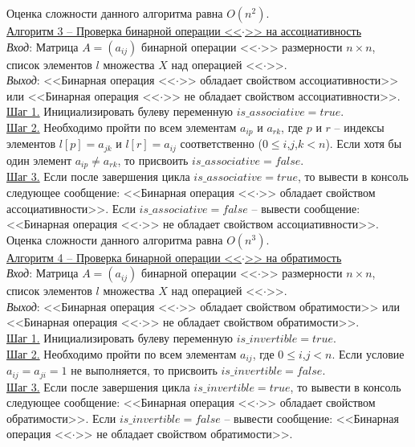 \documentclass[bachelor, och, labwork]{shiza}
\begin{document}
            Оценка сложности данного алгоритма равна $O(n^2)$.\\

        \underline{Алгоритм 3 -- Проверка бинарной операции <<$\cdot$>> на ассоциативность}\\
            \textit{Вход}: Матрица $A = (a_{ij})$ бинарной операции <<$\cdot$>> размерности $n \times n$, список элементов $l$ множества $X$ над
            операцией <<$\cdot$>>.\\
            \textit{Выход}: <<Бинарная операция <<$\cdot$>> обладает свойством ассоциативности>> или 
            <<Бинарная операция <<$\cdot$>> не обладает свойством ассоциативности>>.\\
            \underline{Шаг 1.} Инициализировать булеву переменную $is\_associative = true$.\\
            \underline{Шаг 2.} Необходимо пройти по всем элементам $a_{ip}$ и $a_{rk}$, где $p$ и $r$ -- индексы элементов $l[p] = a_{jk}$
             и $l[r] = a_{ij}$ соответственно ($0 \leq i$,$j$,$k < n$). Если хотя бы один элемент $a_{ip} \neq a_{rk}$, 
            то присвоить $is\_associative = false$.\\
            \underline{Шаг 3.} Если после завершения цикла $is\_associative = true$, то вывести в консоль следующее сообщение:
            <<Бинарная операция <<$\cdot$>> обладает свойством ассоциативности>>. Если $is\_associative = false$ -- вывести сообщение:
            <<Бинарная операция <<$\cdot$>> не обладает свойством ассоциативности>>.\\
            
            Оценка сложности данного алгоритма равна $O(n^3)$.\\
        
            \underline{Алгоритм 4 -- Проверка бинарной операции <<$\cdot$>> на обратимость}\\
            \textit{Вход}: Матрица $A = (a_{ij})$ бинарной операции <<$\cdot$>> размерности $n \times n$, список элементов $l$ множества $X$ над
            операцией <<$\cdot$>>.\\
            \textit{Выход}: <<Бинарная операция <<$\cdot$>> обладает свойством обратимости>> или 
            <<Бинарная операция <<$\cdot$>> не обладает свойством обратимости>>.\\
            \underline{Шаг 1.} Инициализировать булеву переменную $is\_invertible = true$.\\
            \underline{Шаг 2.} Необходимо пройти по всем элементам $a_{ij}$, где $0 \leq i$,$j < n$. Если условие $a_{ij} = a_{ji} = 1$ не 
            выполняется, то присвоить $is\_invertible = false$.\\
            \underline{Шаг 3.} Если после завершения цикла $is\_invertible = true$, то вывести в консоль следующее сообщение:
            <<Бинарная операция <<$\cdot$>> обладает свойством обратимости>>. Если $is\_invertible = false$ -- вывести сообщение:
            <<Бинарная операция <<$\cdot$>> не обладает свойством обратимости>>.\\
            
\end{document}

